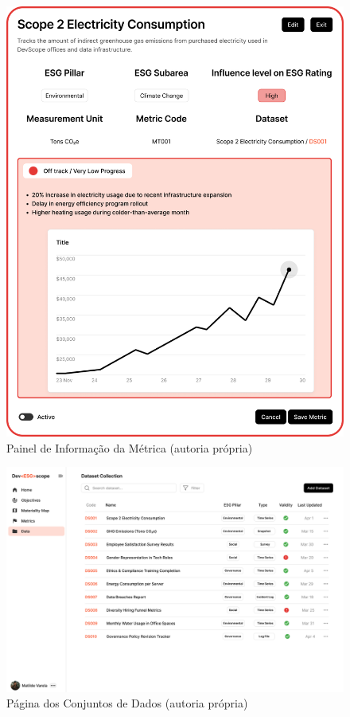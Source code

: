 \begin{figure}[H]
    \centering
    \includegraphics[width=\linewidth]{frontmatter/assets/mockup/Metric Card.png}
    \caption{Painel de Informação da Métrica (autoria própria)}
    \label{fig:metricInfoModal}
\end{figure}


\begin{figure}[H]
    \centering
    \includegraphics[width=\linewidth]{frontmatter/assets/mockup/Data Collection Database.png}
    \caption{Página dos Conjuntos de Dados (autoria própria)}
    \label{fig:datasetPage}
\end{figure}

